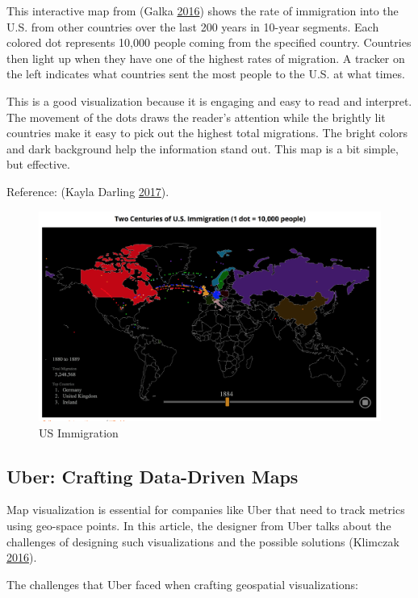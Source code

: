 \documentclass[]{book}
\begin{document}
This interactive map from (Galka
\protect\hyperlink{ref-immigration}{2016}) shows the rate of immigration
into the U.S. from other countries over the last 200 years in 10-year
segments. Each colored dot represents 10,000 people coming from the
specified country. Countries then light up when they have one of the
highest rates of migration. A tracker on the left indicates what
countries sent the most people to the U.S. at what times.

This is a good visualization because it is engaging and easy to read and
interpret. The movement of the dots draws the reader's attention while
the brightly lit countries make it easy to pick out the highest total
migrations. The bright colors and dark background help the information
stand out. This map is a bit simple, but effective.

Reference: (Kayla Darling \protect\hyperlink{ref-cool_data}{2017}).

\begin{figure}
\centering
\includegraphics{images/immigration.png}
\caption{US Immigration}
\end{figure}

\subsection{Uber: Crafting Data-Driven
Maps}\label{uber-crafting-data-driven-maps}

Map visualization is essential for companies like Uber that need to
track metrics using geo-space points. In this article, the designer from
Uber talks about the challenges of designing such visualizations and the
possible solutions (Klimczak \protect\hyperlink{ref-uber_maps}{2016}).

The challenges that Uber faced when crafting geospatial visualizations:
\end{document}

